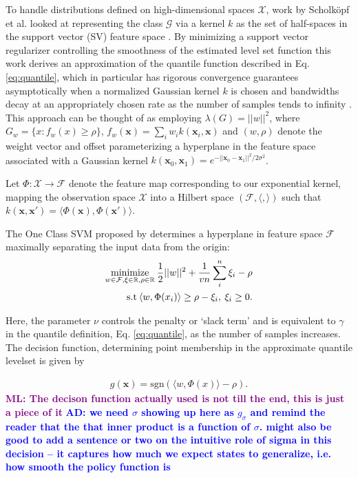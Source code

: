 \documentclass[10pt, conference]{ieeeconf}      %
\newcommand{\bx}{\mathbf{x}}
\newcommand{\adnote}[1]{\ifthenelse{ \boolean{include-notes}}%
 {\textcolor{blue}{\textbf{AD: #1}}}{}}
\newcommand{\mlnote}[1]{\ifthenelse{ \boolean{include-notes}}%
 {\textcolor{purple}{\textbf{ML: #1}}}{}}
\begin{document}
To handle distributions defined on high-dimensional spaces $\mathcal{X}$, work by Scholk{\"o}pf et al. looked at representing the class $\mathcal{G}$ via a kernel $k$ as the set of half-spaces in the support vector (SV) feature space \cite{scholkopf2001estimating}. 
By minimizing a support vector regularizer controlling the smoothness of the estimated level set function this work
derives an approximation of the quantile function described in Eq. \ref{eq:quantile}, which in particular has rigorous
convergence guarantees asymptotically when a normalized Gaussian kernel $k$ is chosen and bandwidths decay at an
appropriately chosen rate as the number of samples tends to infinity \cite{vert2006consistency}.
This approach can be thought of as employing $\lambda(G) = ||w||^2$, where $G_w = \lbrace x: f_w(x) \geq \rho \rbrace$,
$f_w(\mathbf{x}) = \sum_i w_i k(\mathbf{x}_i, \mathbf{x})$
and $(w,\rho)$ denote the weight vector and offset parameterizing a hyperplane in the feature space associated with a
Gaussian kernel $k(\bx_0,\bx_1) = e^{-||\bx_0 - \bx_1||^2/2\sigma^2}$.


Let $\Phi:\mathcal{X}\to \mathcal{F}$ denote the feature map corresponding to our exponential kernel, mapping the
observation space $\mathcal{X}$ into a Hilbert space $(\mathcal{F}, \langle, \rangle)$ such that $k(\bx, \bx') = \langle
\Phi(\bx), \Phi(\bx')\rangle$.

The One Class SVM proposed by \cite{scholkopf2001estimating} determines a hyperplane in feature space $\mathcal{F}$
maximally separating the input data from the origin:
\vspace{-2ex}
\begin{align}\label{eq:primal_sup}
    \underset{w\in \mathcal{F}, \mathbf{\xi} \in \mathbb{R}, \rho \in \mathbb{R}}{\mbox{minimize}}\: \frac{1}{2}||w||^2+\frac{1}{vn} \sum^n_i \xi_i - \rho\\
\mbox{s.t} \: \langle w,\Phi(x_i) \rangle \geq \rho - \xi_i, \: \xi_i \geq 0 \notag.
\end{align}

Here, the parameter $\nu$ controls the penalty or `slack term' and is equivalent to $\gamma$ \cite{vert2006consistency}
in the quantile definition, Eq. \ref{eq:quantile}, as the number of samples increases. The decision
function, determining point membership in the approximate quantile levelset is given by

\vspace{-2ex}
\begin{align}\label{eq:decision_func}
g(\bx) = \mbox{sgn}(\langle w,\Phi(x) \rangle-\rho).
\end{align}
\mlnote{The decison function actually used is not till the end, this is just a piece of it}
\adnote{we need $\sigma$ showing up here as $g_{\sigma}$ and remind the reader that the that inner product is a function of $\sigma$. might also be good to add a sentence or two on the intuitive role of sigma in this decision -- it captures how much we expect states to generalize, i.e. how smooth the policy function is}
\end{document}
